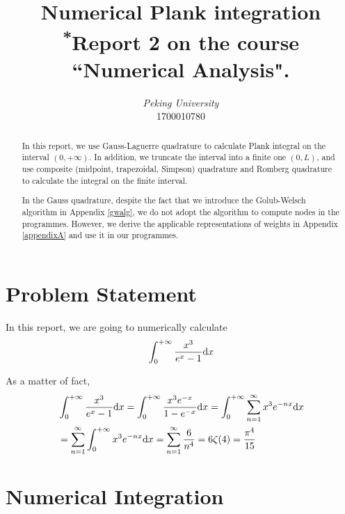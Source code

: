 \documentclass[conference,onecolumn,12pt]{IEEEtran}
\theoremstyle{definition}
\begin{document}
\title{{Numerical Plank integration}\\
{\footnotesize \textsuperscript{*}Report 2 on the course ``Numerical Analysis".}
}

\author{
\textit{Peking University}\\
1700010780}

\maketitle
\begin{abstract}
    In this report, we use Gauss-Laguerre quadrature to calculate Plank integral on the interval $(0,+\infty)$. In addition, we truncate the interval into a finite one $(0,L)$, and use composite (midpoint, trapezoidal, Simpson) quadrature and Romberg quadrature to calculate the integral on the finite interval.

    In the Gauss quadrature, despite the fact that we introduce the Golub-Welsch algorithm in Appendix \ref{gwalg}, we do not adopt the algorithm to compute nodes in the programmes. However, we derive the applicable representations of weights in Appendix \ref{appendixA} and use it in our programmes. 
\end{abstract}
\tableofcontents
\section{Problem Statement}
In this report, we are going to numerically calculate
\begin{equation}
    \label{int}
    \int_0^{+\infty} \frac{x^3}{e^x-1} {\rm d} x
\end{equation}

As a matter of fact,
\begin{equation}
    \begin{split}
        &\int_0^{+\infty} \frac{x^3}{e^x-1} {\rm d} x =     \int_0^{+\infty} \frac{x^3 e^{-x}}{1-e^{-x}} {\rm d} x = \int_0^{+\infty} \sum_{n=1}^{\infty} x^3e^{-nx} {\rm d} x\\
        & = \sum_{n=1}^{\infty} \int_0^{+\infty} x^3e^{-nx} {\rm d} x = \sum_{n=1}^{\infty} \frac{6}{n^4} = 6\zeta(4) = \frac{\pi^4}{15}
    \end{split}
\end{equation}

\section{Numerical Integration}
\end{document}
